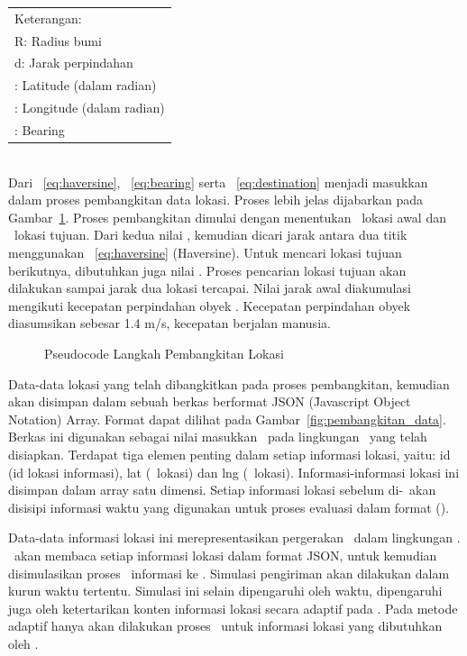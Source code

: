 \begin{tabular}{l}
	Keterangan: \\
	R: Radius bumi \\
	d: Jarak perpindahan \\
	\varphi: Latitude (dalam radian) \\
	\lambda: Longitude (dalam radian) \\
	\theta: Bearing\\
\end{tabular} \\

Dari \equ~\ref{eq:haversine}, \equ~\ref{eq:bearing} serta
\equ~\ref{eq:destination} menjadi masukkan dalam proses pembangkitan data
lokasi. Proses lebih jelas dijabarkan pada Gambar~\ref{fig:pembangkitan}. Proses
pembangkitan dimulai dengan menentukan \centroid~lokasi awal dan
\centroid~lokasi tujuan. Dari kedua nilai \centroid, kemudian dicari jarak
antara dua titik menggunakan ~\ref{eq:haversine} (Haversine). Untuk mencari
lokasi tujuan berikutnya, dibutuhkan juga nilai \bearing. Proses pencarian
lokasi tujuan akan dilakukan sampai jarak dua lokasi tercapai. Nilai jarak awal
diakumulasi mengikuti kecepatan perpindahan obyek \tracking.  Kecepatan
perpindahan obyek diasumsikan sebesar 1.4 m/s, kecepatan berjalan manusia.

\noindent
\begin{figure}
	\centering
	\lstset{basicstyle=\ttfamily,frame=single}
	
	\caption{Pseudocode Langkah Pembangkitan Lokasi}
\label{fig:pembangkitan}
\end{figure}

Data-data lokasi yang telah dibangkitkan pada proses pembangkitan, kemudian akan
disimpan dalam sebuah berkas berformat JSON (\f{Javascript Object Notation})
Array. Format dapat dilihat pada Gambar~\ref{fig:pembangkitan_data}. Berkas ini
digunakan sebagai nilai masukkan \publisher~pada lingkungan \testbed~yang telah
disiapkan. Terdapat tiga elemen penting dalam setiap informasi lokasi, yaitu: id
(id lokasi informasi), lat (\latitude~lokasi) dan lng (\longitude~lokasi).
Informasi-informasi lokasi ini disimpan dalam array satu dimensi. Setiap
informasi lokasi sebelum di-\publish~akan disisipi informasi waktu yang
digunakan untuk proses evaluasi dalam format \unixtimetstamp(\miliseconds).

Data-data informasi lokasi ini merepresentasikan pergerakan \publisher~dalam
lingkungan \testbed. \Publisher~akan membaca setiap informasi lokasi dalam
format JSON, untuk kemudian disimulasikan proses \publish~informasi ke \broker.
Simulasi pengiriman akan dilakukan dalam kurun waktu tertentu. Simulasi ini
selain dipengaruhi oleh waktu, dipengaruhi juga oleh ketertarikan konten
informasi lokasi secara adaptif pada \subscriber. Pada metode adaptif hanya akan
dilakukan proses \publish~untuk informasi lokasi yang dibutuhkan oleh
\subscriber.

